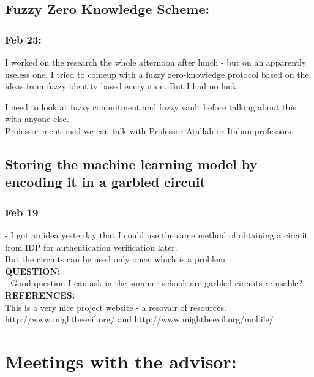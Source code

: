 \documentclass[11pt]{article}
\begin{document}
\subsection*{Fuzzy Zero Knowledge Scheme:}
\subsubsection*{Feb 23:}
I worked on the research the whole afternoon after lunch - but on an apparently useless one. I tried to comeup with a fuzzy zero-knowledge protocol 
based on the ideas from fuzzy identity based encryption. But I had no luck.

I need to look at fuzzy commitment and fuzzy vault before talking about this with anyone else.\\
Professor mentioned we can talk with Professor Atallah or Italian professors.\\

\subsection*{Storing the machine learning model by encoding it in a garbled circuit}
\subsubsection*{Feb 19}
- I got an idea yesterday that I could use the same method of obtaining a circuit from IDP for authentication verification later.\\ 
But the circuits can be used only once, which is a problem.\\
\textbf{QUESTION:}\\
- Good question I can ask in the summer school: are garbled circuits re-usable?\\

\textbf{REFERENCES:}\\
This is a very nice project website - a resovair of resources. http://www.mightbeevil.org/ and http://www.mightbeevil.org/mobile/


\pagebreak
\section*{Meetings with the advisor:}
\end{document}

